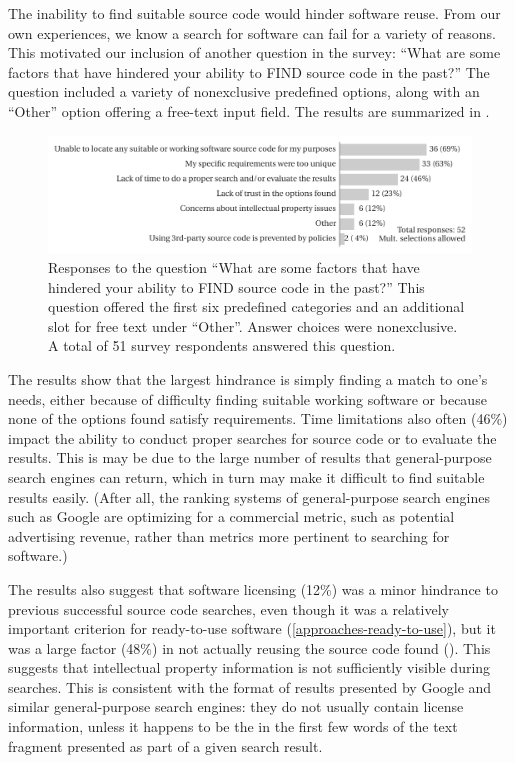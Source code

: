 \documentclass{casicswhitepaper}
\begin{document}
The inability to find suitable source code would hinder software reuse.  From our own experiences, we know a search for software can fail for a variety of reasons.  This motivated our inclusion of another question in the survey: ``What are some factors that have hindered your ability to FIND source code in the past?''  The question included a variety of nonexclusive predefined options, along with an ``Other'' option offering a free-text input field.  The results are summarized in .

\begin{figure}[b]
  \centering
  \includegraphics[width=6.5in]{files/plots/factors-that-hindered-finding-src.pdf}
  \vspace*{-4ex}
  \caption{Responses to the question ``What are some factors that have hindered your ability to FIND source code in the past?''  This question offered the first six predefined categories and an additional slot for free text under ``Other''.  Answer choices were nonexclusive.  A total of 51 survey respondents answered this question.}
  \label{factors-that-hindered}
\end{figure}

The results show that the largest hindrance is simply finding a match to one's needs, either because of difficulty finding suitable working software or because none of the options found satisfy requirements.  Time limitations also often (46\%) impact the ability to conduct proper searches for source code or to evaluate the results.  This is may be due to the large number of results that general-purpose search engines can return, which in turn may make it difficult to find suitable results easily.  (After all, the ranking systems of general-purpose search engines such as Google are optimizing for a commercial metric, such as potential advertising revenue, rather than metrics more pertinent to searching for software.)

The results also suggest that software licensing (12\%) was a minor hindrance to previous successful source code searches, even though it was a relatively important criterion for ready-to-use software (\ref{approaches-ready-to-use}), but it was a large factor (48\%) in not actually reusing the source code found (). This suggests that intellectual property information is not sufficiently visible during searches.  This is consistent with the format of results presented by Google and similar general-purpose search engines: they do not usually contain license information, unless it happens to be the in the first few words of the text fragment presented as part of a given search result.
\end{document}
